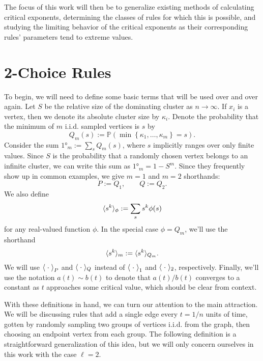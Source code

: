 \documentclass[twoside,10pt]{article}
\begin{document}
The focus of this work will then be to generalize existing methods of calculating critical exponents, determining the classes of rules for which this is possible, and studying the limiting behavior of the critical exponents as their corresponding rules' parameters tend to extreme values.

\section{2-Choice Rules}

To begin, we will need to define some basic terms that will be used over and over again. Let $S$ be the relative size of the dominating cluster as $n \to \infty$. If $x_i$ is a vertex, then we denote its absolute cluster size by $\kappa_i$. Denote the probability that the minimum of $m$ i.i.d. sampled vertices is $s$ by
\[
        Q_m(s) := \mathbb{P}\left( \min\left\{ \kappa_1, \dots, \kappa_m \right\} = s \right) .
\]
Consider the sum $\ang{1}_{m} := \sum_{s} Q_{m}(s)$, where $s$ implicitly ranges over only finite values. Since $S$ is the probability that a randomly chosen vertex belongs to an infinite cluster, we can write this sum as $\ang{1}_{m} = 1-S^{m}$. Since they frequently show up in common examples, we give $m=1$ and $m=2$ shorthands:
\[
        P := Q_1, \quad\quad Q := Q_2.
\]
We also define
\[
	\langle s^{k} \rangle_{\phi} := \sum_{s} s^{k} \phi(s)
\] 
for any real-valued function $\phi$. In the special case $\phi = Q_{m}$, we'll use the shorthand
\[
        \langle s^{k} \rangle_{m} := \langle s^{k} \rangle_{Q_{m}}.
\]
We will use $\left\langle \;\cdot\; \right\rangle_{P}$ and $\langle \;\cdot\; \rangle_{Q}$ instead of $\left\langle \;\cdot\; \right\rangle_{1}$ and $\langle \;\cdot\; \rangle_{2}$, respectively. Finally, we'll use the notation $a(t) \sim b(t)$ to denote that $a(t)/b(t)$ converges to a constant as $t$ approaches some critical value, which should be clear from context.

With these definitions in hand, we can turn our attention to the main attraction. We will be discussing rules that add a single edge every $t=1/n$ units of time, gotten by randomly sampling two groups of vertices i.i.d. from the graph, then choosing an endpoint vertex from each group. The following definition is a straightforward generalization of this idea, but we will only concern ourselves in this work with the case $\ell=2$.
\end{document}
